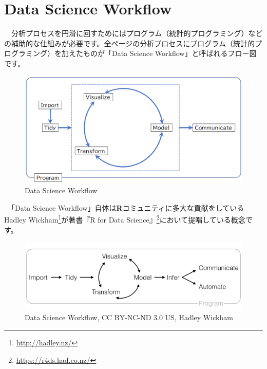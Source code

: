 \documentclass[
  12pt,
]{book}
\DeclareRobustCommand{\href}[2]{#2\footnote{\url{#1}}}
\begin{document}
\newpage

\hypertarget{data-science-workflow}{%
\section*{Data Science Workflow}\label{data-science-workflow}}

　分析プロセスを円滑に回すためにはプログラム（統計的プログラミング）などの補助的な仕組みが必要です。全ページの分析プロセスにプログラム（統計的プログラミング）を加えたものが「Data Science Workflow」と呼ばれるフロー図です。

\begin{figure}[H]

{\centering \includegraphics[width=0.9\linewidth,]{./fig/DSWF/data_science_workflow} 

}

\caption{Data Science Workflow}\label{fig:unnamed-chunk-11}
\end{figure}

　「Data Science Workflow」自体は\textbf{R}コミュニティに多大な貢献をしている\href{http://hadley.nz/}{Hadley Wickham}が著書\href{https://r4ds.had.co.nz/}{『R for Data Science』}において提唱している概念です。

\begin{figure}[H]

{\centering \includegraphics[width=0.9\linewidth,]{fig/data-science} 

}

\caption{Data Science Workflow, CC BY-NC-ND 3.0 US, Hadley Wickham}\label{fig:unnamed-chunk-12}
\end{figure}
\end{document}
